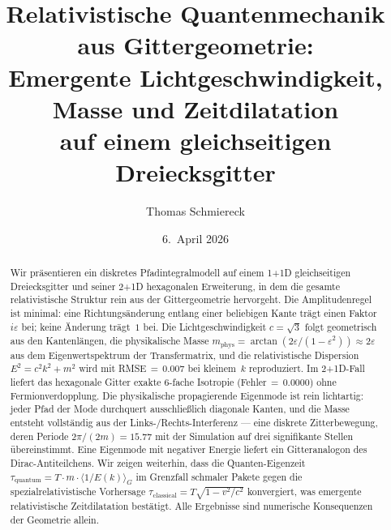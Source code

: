 \documentclass[twocolumn,showpacs,preprintnumbers,amsmath,amssymb]{revtex4-2}
\newcommand{\eps}{\varepsilon}
\newcommand{\mphys}{m_{\mathrm{phys}}}
\newcommand{\tauq}{\tau_{\mathrm{quantum}}}
\newcommand{\taucl}{\tau_{\mathrm{classical}}}
\newcommand{\avg}[1]{\langle #1 \rangle}
\begin{document}

\title{Relativistische Quantenmechanik aus Gittergeometrie:\\
Emergente Lichtgeschwindigkeit, Masse und Zeitdilatation\\
auf einem gleichseitigen Dreiecksgitter}

\author{Thomas Schmiereck}

\date{6.~April 2026}

\begin{abstract}
Wir präsentieren ein diskretes Pfadintegralmodell auf einem \mbox{1\!+\!1D}
gleichseitigen Dreiecksgitter und seiner \mbox{2\!+\!1D} hexagonalen
Erweiterung, in dem die gesamte relativistische Struktur rein aus der
Gittergeometrie hervorgeht.
Die Amplitudenregel ist minimal: eine Richtungsänderung entlang einer beliebigen
Kante trägt einen Faktor $i\eps$ bei; keine Änderung trägt~$1$ bei.
Die Lichtgeschwindigkeit $c = \sqrt{3}$ folgt geometrisch aus den Kantenlängen,
die physikalische Masse $\mphys = \arctan(2\eps/(1{-}\eps^2)) \approx 2\eps$ aus
dem Eigenwertspektrum der Transfermatrix, und die relativistische Dispersion
$E^2 = c^2 k^2 + m^2$ wird mit RMSE\,$=\,0.007$ bei kleinem~$k$ reproduziert.
Im \mbox{2\!+\!1D}-Fall liefert das hexagonale Gitter exakte 6-fache Isotropie
(Fehler\,$=\,0.0000$) ohne Fermionverdopplung.
Die physikalische propagierende Eigenmode ist rein lichtartig: jeder Pfad der
Mode durchquert ausschließlich diagonale Kanten, und die Masse entsteht
vollständig aus der Links-/Rechts-Interferenz --- eine diskrete Zitterbewegung,
deren Periode $2\pi/(2m) = 15.77$ mit der Simulation auf drei signifikante
Stellen übereinstimmt.
Eine Eigenmode mit negativer Energie liefert ein Gitteranalogon des
Dirac-Antiteilchens.
Wir zeigen weiterhin, dass die Quanten-Eigenzeit
$\tauq = T \cdot m \cdot \avg{1/E(k)}_G$ im Grenzfall schmaler Pakete gegen
die spezialrelativistische Vorhersage $\taucl = T\sqrt{1 - v^2/c^2}$
konvergiert, was emergente relativistische Zeitdilatation bestätigt.
Alle Ergebnisse sind numerische Konsequenzen der Geometrie allein.
\end{abstract}

\maketitle

\end{document}
